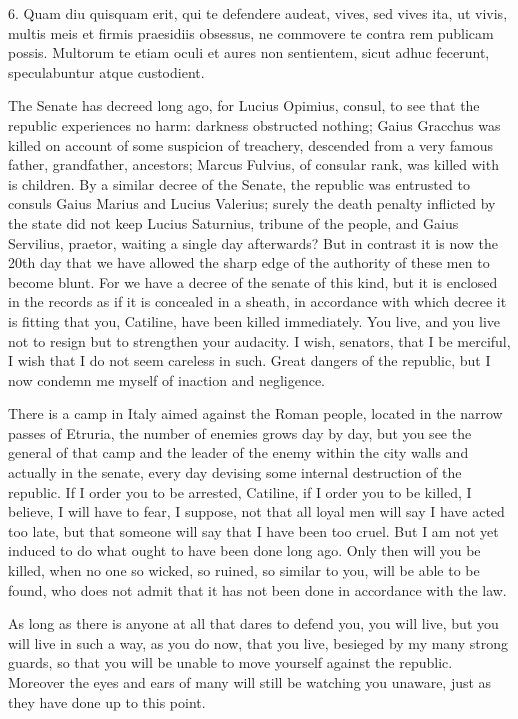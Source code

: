 {  6. Quam diu quisquam erit, qui te defendere audeat, vives, sed vives ita, ut vivis, multis meis et firmis praesidiis obsessus, ne commovere te contra rem publicam possis. Multorum te etiam oculi et aures non sentientem, sicut adhuc fecerunt, speculabuntur atque custodient.
}{
  The Senate has decreed long ago, for Lucius Opimius, consul, to see that the republic experiences no harm: darkness obstructed nothing; Gaius Gracchus was killed on account of some suspicion of treachery, descended from a very famous father, grandfather, ancestors; Marcus Fulvius, of consular rank, was killed with is children. By a similar decree of the Senate, the republic was entrusted to consuls Gaius Marius and Lucius Valerius; surely the death penalty inflicted by the state did not keep Lucius Saturnius, tribune of the people, and Gaius Servilius, praetor, waiting a single day afterwards? But in contrast it is now the 20th day that we have allowed the sharp edge of the authority of these men to become blunt. For we have a decree of the senate of this kind, but it is enclosed in the records as if it is concealed in a sheath, in accordance with which decree it is fitting that you, Catiline, have been killed immediately. You live, and you live not to resign but to strengthen your audacity. I wish, senators, that I be merciful, I wish that I do not seem careless in such. Great dangers of the republic, but I now condemn me myself of inaction and negligence.

  There is a camp in Italy aimed against the Roman people, located in the narrow passes of Etruria, the number of enemies grows day by day, but you see the general of that camp and the leader of the enemy within the city walls and actually in the senate, every day devising some internal destruction of the republic. If I order you to be arrested, Catiline, if I order you to be killed, I believe, I will have to fear, I suppose, not that all loyal men will say I have acted too late, but that someone will say that I have been too cruel. But I am not yet induced to do what ought to have been done long ago. Only then will you be killed, when no one so wicked, so ruined, so similar to you, will be able to be found, who does not admit that it has not been done in accordance with the law.

  As long as there is anyone at all that dares to defend you, you will live, but you will live in such a way, as you do now, that you live, besieged by my many strong guards, so that you will be unable to move yourself against the republic. Moreover the eyes and ears of many will still be watching you unaware, just as they have done up to this point.
}
